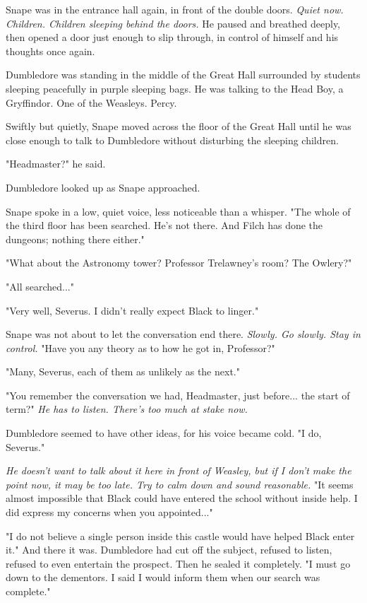 \documentclass[a4paper,11pt]{article}
\begin{document}
Snape was in the entrance hall again, in front of the double doors. \emph{Quiet now. Children. Children sleeping behind the doors.} He paused and breathed deeply, then opened a door just enough to slip through, in control of himself and his thoughts once again.

Dumbledore was standing in the middle of the Great Hall surrounded by students sleeping peacefully in purple sleeping bags. He was talking to the Head Boy, a Gryffindor. One of the Weasleys. Percy.

Swiftly but quietly, Snape moved across the floor of the Great Hall until he was close enough to talk to Dumbledore without disturbing the sleeping children.

"Headmaster?" he said.

Dumbledore looked up as Snape approached.

Snape spoke in a low, quiet voice, less noticeable than a whisper. "The whole of the third floor has been searched. He's not there. And Filch has done the dungeons; nothing there either."

"What about the Astronomy tower? Professor Trelawney's room? The Owlery?"

"All searched..."

"Very well, Severus. I didn't really expect Black to linger."

Snape was not about to let the conversation end there. \emph{Slowly. Go slowly. Stay in control.} "Have you any theory as to how he got in, Professor?"

"Many, Severus, each of them as unlikely as the next."

"You remember the conversation we had, Headmaster, just before... the start of term?" \emph{He has to listen. There's too much at stake now.}

Dumbledore seemed to have other ideas, for his voice became cold. "I do, Severus."

\emph{He doesn't want to talk about it here in front of Weasley, but if I don't make the point now, it may be too late. Try to calm down and sound reasonable.} "It seems almost impossible that Black could have entered the school without inside help. I did express my concerns when you appointed..."

"I do not believe a single person inside this castle would have helped Black enter it." And there it was. Dumbledore had cut off the subject, refused to listen, refused to even entertain the prospect. Then he sealed it completely. "I must go down to the dementors. I said I would inform them when our search was complete."
\end{document}
